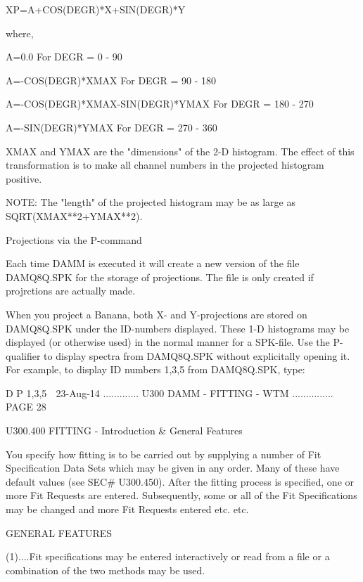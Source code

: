         XP=A+COS(DEGR)*X+SIN(DEGR)*Y
 
         where,
 
         A=0.0                               For DEGR =   0 -  90
 
         A=-COS(DEGR)*XMAX                   For DEGR =  90 - 180
 
         A=-COS(DEGR)*XMAX-SIN(DEGR)*YMAX    For DEGR = 180 - 270
 
         A=-SIN(DEGR)*YMAX                   For DEGR = 270 - 360
 
 
   XMAX  and  YMAX  are  the  "dimensions" of the 2-D histogram. The effect of
   this transformation is  to  make  all  channel  numbers  in  the  projected
   histogram positive.
 
   NOTE:  The  "length"  of  the  projected  histogram  may  be  as  large  as
          SQRT(XMAX**2+YMAX**2).
 
   Projections via the P-command
 
   Each time DAMM is executed it  will  create  a  new  version  of  the  file
   DAMQ8Q.SPK  for  the  storage  of  projections. The file is only created if
   projrctions are actually made.
 
   When you project  a  Banana,  both  X-  and  Y-projections  are  stored  on
   DAMQ8Q.SPK  under  the  ID-numbers  displayed.  These 1-D histograms may be
   displayed (or otherwise used) in the normal manner for a SPK-file. Use  the
   P-qualifier  to  display  spectra  from  DAMQ8Q.SPK  without   explicitally
   opening it. For example, to display ID numbers 1,3,5 from DAMQ8Q.SPK, type:
 
   D P 1,3,5
    
   23-Aug-14 ............. U300  DAMM - FITTING - WTM ............... PAGE  28
 
   U300.400  FITTING - Introduction & General Features
 
   You  specify  how fitting is to be carried out by supplying a number of Fit
   Specification Data Sets which may be given in  any  order.  Many  of  these
   have  default  values  (see  SEC#  U300.450).  After the fitting process is
   specified, one or more Fit Requests are entered. Subsequently, some or  all
   of  the  Fit  Specifications  may  be changed and more Fit Requests entered
   etc. etc.
 
                                GENERAL FEATURES
 
   (1)....Fit specifications may be entered interactively or read from a  file
          or a combination of the two methods may be used.
 
